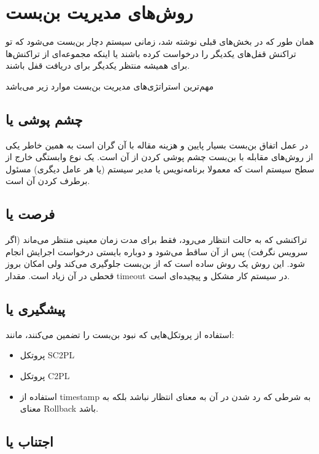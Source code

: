 \documentclass[a4paper]{article}
\begin{document}
\newpage

\section{روش‌های مدیریت بن‌بست}

همان طور که در بخش‌های قبلی نوشته شد، زمانی سیستم دچار بن‌بست می‌شود که تو
تراکنش قفل‌های یکدیگر را درخواست کرده باشند یا اینکه مجموعه‌ای از تراکنش‌ها برای
همیشه منتظر یکدیگر برای دریافت قفل باشند.

مهم‌ترین استراتژی‌های مدیریت بن‌بست موارد زیر می‌باشد

\subsection{چشم پوشی یا }

در عمل اتفاق بن‌بست بسیار پایین و هزینه مقاله با آن گران است به همین خاطر یکی از
روش‌های مقابله با بن‌بست چشم پوشی کردن از آن است.  یک نوع وابستگی خارج از سطح
سیستم است که معمولا برنامه‌نویس یا مدیر سیستم (یا هر عامل دیگری) مسئول برطرف
کردن آن است.

\subsection{فرصت یا }

تراکنشی که به حالت انتظار می‌رود، فقط برای مدت زمان معینی منتظر می‌ماند (اگر
سرویس نگرفت) پس از آن ساقط می‌شود و دوباره بایستی درخواست اجرایش انجام شود. این
روش یک روش ساده است که از بن‌بست جلوگیری می‌کند ولی امکان بروز قحطی در آن زیاد
است. مقدار timeout در سیستم کار مشکل و پیچیده‌ای است.

\subsection{پیشگیری یا }

استفاده از پروتکل‌هایی که نبود بن‌بست را تضمین می‌کنند، مانند:

\begin{itemize}
    \item پروتکل SC2PL
    \item پروتکل C2PL
    \item استفاده از timestamp به شرطی که رد شدن در آن به معنای انتظار نباشد
    بلکه به معنای Rollback باشد.
\end{itemize}

\subsection{اجتناب یا }
\end{document}

